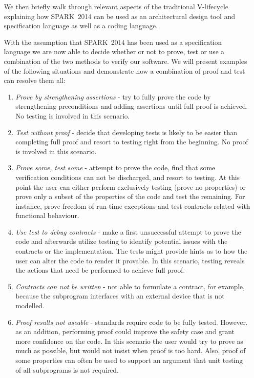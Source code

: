 \documentclass{sig-alternate-2013}
\newcommand{\newspark}{SPARK~2014\xspace}
\begin{document}
We then briefly walk through relevant aspects of the traditional
V-lifecycle explaining how \newspark can be used as an architectural
design tool and specification language as well as a coding language.

With the assumption that \newspark has been used as a specification
language we are now able to decide whether or not to prove, test or
use a combination of the two methods to verify our software.  We will
present examples of the following situations and demonstrate how a
combination of proof and test can resolve them all:
\begin {enumerate}
\item \emph{Prove by strengthening assertions} - try to fully prove
  the code by strengthening preconditions and adding assertions until
  full proof is achieved. No testing is involved in this scenario.

\item \emph{Test without proof} - decide that developing tests is
  likely to be easier than completing full proof and resort to testing
  right from the beginning. No proof is involved in this scenario.

\item \emph{Prove some, test some} - attempt to prove the code, find
  that some verification conditions can not be discharged, and resort
  to testing. At this point the user can either perform exclusively
  testing (prove no properties) or prove only a subset of the
  properties of the code and test the remaining. For instance, prove
  freedom of run-time exceptions and test contracts related with
  functional behaviour.

\item \emph{Use test to debug contracts} - make a first unsuccessful
  attempt to prove the code and afterwards utilize testing to identify
  potential issues with the contracts or the implementation. The tests
  might provide hints as to how the user can alter the code to render
  it provable. In this scenario, testing reveals the actions that need
  be performed to achieve full proof.

\item \emph{Contracts can not be written} - not able to formulate a
  contract, for example, because the subprogram interfaces with an
  external device that is not modelled.

\item \emph{Proof results not useable} - standards require code to
  be fully tested. However, as an addition, performing proof could
  improve the safety case and grant more confidence on the code. In
  this scenario the user would try to prove as much as possible, but
  would not insist when proof is too hard. Also, proof of some
  properties can often be used to support an argument that
  unit testing of all subprograms is not required.

\end{enumerate}
\end{document}
